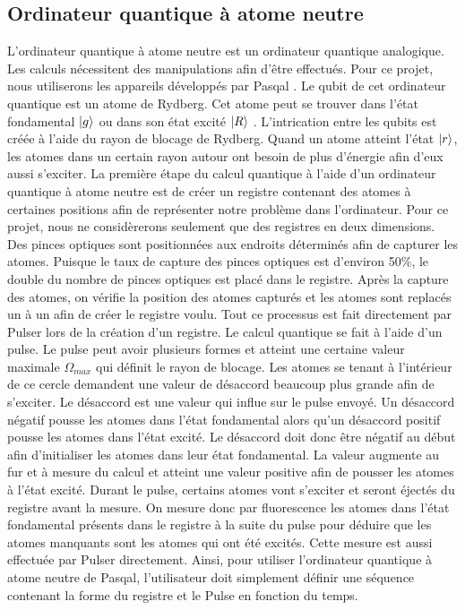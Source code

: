 \documentclass[11pt]{article}
\begin{document}
\subsection{Ordinateur quantique à atome neutre}
L'ordinateur quantique à atome neutre est un ordinateur quantique analogique. Les calculs nécessitent des manipulations afin d'être effectués. Pour ce projet, nous utiliserons les appareils développés par Pasqal \cite{browaeys_quantum_2019}. Le qubit de cet ordinateur quantique est un atome de Rydberg. Cet atome peut se trouver dans l'état fondamental $\ket{g}$ ou dans son état excité $\ket{R}$ \cite{noauthor_learn_nodate}. L'intrication entre les qubits est créée à l'aide du rayon de blocage de Rydberg. Quand un atome atteint l'état $\ket{r}$, les atomes dans un certain rayon autour ont besoin de plus d'énergie afin d'eux aussi s'exciter. La première étape du calcul quantique à l'aide d'un ordinateur quantique à atome neutre est de créer un registre contenant des atomes à certaines positions afin de représenter notre problème dans l'ordinateur. Pour ce projet, nous ne considèrerons seulement que des registres en deux dimensions. Des pinces optiques sont positionnées \cite{browaeys_pinces_2016} aux endroits déterminés afin de capturer les atomes. Puisque le taux de capture des pinces optiques est d'environ 50\%, le double du nombre de pinces optiques est placé dans le registre. Après la capture des atomes, on vérifie la position des atomes capturés et les atomes sont replacés un à un afin de créer le registre voulu. Tout ce processus est fait directement par Pulser \cite{silverio_pulser_2022} lors de la création d'un registre. Le calcul quantique se fait à l'aide d'un pulse. Le pulse peut avoir plusieurs formes et atteint une certaine valeur maximale $\Omega_{max} $ qui définit le rayon de blocage.  Les atomes se tenant à l'intérieur de ce cercle demandent une valeur de désaccord beaucoup plus grande afin de s'exciter. Le désaccord est une valeur qui influe sur le pulse envoyé. Un désaccord négatif pousse les atomes dans l'état fondamental alors qu'un désaccord positif pousse les atomes dans l'état excité. Le désaccord doit donc être négatif au début afin d'initialiser les atomes dans leur état fondamental. La valeur augmente au fur et à mesure du calcul et atteint une valeur positive afin de pousser les atomes à l'état excité. Durant le pulse, certains atomes vont s'exciter et seront éjectés du registre avant la mesure. On mesure donc par fluorescence les atomes dans l'état fondamental présents dans le registre à la suite du pulse pour déduire que les atomes manquants sont les atomes qui ont été excités. Cette mesure est aussi effectuée par Pulser directement. Ainsi, pour utiliser l'ordinateur quantique à atome neutre de Pasqal, l'utilisateur doit simplement définir une séquence contenant la forme du registre et le Pulse en fonction du temps. 
\end{document}
